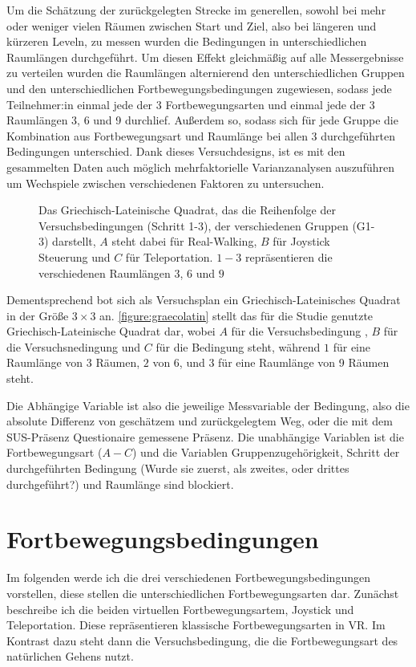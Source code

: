     Um die Schätzung der zurückgelegten Strecke im generellen, sowohl bei mehr oder weniger vielen Räumen zwischen Start und Ziel, also bei längeren und kürzeren Leveln, zu messen wurden die Bedingungen in unterschiedlichen Raumlängen durchgeführt. Um diesen Effekt gleichmäßig auf alle Messergebnisse zu verteilen wurden die Raumlängen alternierend den unterschiedlichen Gruppen und den unterschiedlichen Fortbewegungsbedingungen zugewiesen, sodass jede Teilnehmer:in einmal jede der 3 Fortbewegungsarten und einmal jede der 3 Raumlängen 3, 6 und 9 durchlief. Außerdem so, sodass sich für jede Gruppe die Kombination aus Fortbewegungsart und Raumlänge bei allen 3 durchgeführten Bedingungen unterschied. Dank dieses Versuchdesigns, ist es mit den gesammelten Daten auch möglich mehrfaktorielle Varianzanalysen auszuführen um Wechspiele zwischen verschiedenen Faktoren zu untersuchen.

    \begin{figure}[!h]
        \centering
        

        \caption{Das Griechisch-Lateinische Quadrat, das die Reihenfolge der Versuchsbedingungen (Schritt 1-3), der verschiedenen Gruppen (G1-3) darstellt, $A$ steht dabei für Real-Walking, $B$ für Joystick Steuerung und $C$ für Teleportation. $1-3$ repräsentieren die verschiedenen Raumlängen $3$, $6$ und $9$}\label{figure:graecolatin}
    \end{figure}

    Dementsprechend bot sich als Versuchsplan ein Griechisch-Lateinisches Quadrat in der Größe $3 \times 3$ an. \autoref{figure:graecolatin} stellt das für die Studie genutzte Griechisch-Lateinische Quadrat dar, wobei $A$ für die Versuchsbedingung , $B$ für die Versuchsnedingung  und $C$ für die Bedingung  steht, während $1$ für eine Raumlänge von 3 Räumen, $2$ von 6, und $3$ für eine Raumlänge von 9 Räumen steht.

    Die Abhängige Variable ist also die jeweilige Messvariable der Bedingung, also die absolute Differenz von geschätzem und zurückgelegtem Weg, oder die mit dem SUS-Präsenz Questionaire gemessene Präsenz. Die unabhängige Variablen ist die Fortbewegungsart ($A-C$) und die Variablen Gruppenzugehörigkeit, Schritt der durchgeführten Bedingung (Wurde sie zuerst, als zweites, oder drittes durchgeführt?) und Raumlänge sind blockiert. %

    \section{Fortbewegungsbedingungen}\label{sec:conditions}
        Im folgenden werde ich die drei verschiedenen Fortbewegungsbedingungen vorstellen, diese stellen die unterschiedlichen Fortbewegungsarten dar. Zunächst beschreibe ich die beiden virtuellen Fortbewegungsartem, Joystick und Teleportation. Diese repräsentieren klassische Fortbewegungsarten in VR. Im Kontrast dazu steht dann die Versuchsbedingung, die die Fortbewegungsart des natürlichen Gehens nutzt.

